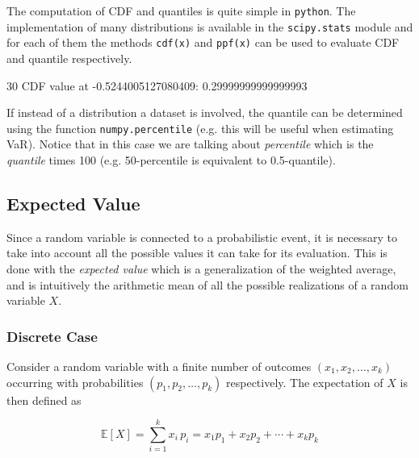 The computation of CDF and quantiles is quite simple in \texttt{python}. The implementation of many distributions is available in the \texttt{scipy.stats} module and for each of them the methods \texttt{cdf(x)} and \texttt{ppf(x)} can be used to evaluate CDF and quantile respectively.


\begin{ioutput}
30%
CDF value at -0.5244005127080409: 0.29999999999999993
\end{ioutput}

If instead of a distribution a dataset is involved, the quantile can be determined using the function \texttt{numpy.percentile} (e.g. this will be useful when estimating VaR). Notice that in this case we are talking about \emph{percentile} which is the \emph{quantile} times 100 (e.g. 50-percentile is equivalent to 0.5-quantile).


\begin{ioutput}
[1.08 5.  ]
\end{ioutput}

\subsection{Expected Value}\label{sec:expected-value}

Since a random variable is connected to a probabilistic event, it is necessary to take into account all the possible values it can take for its evaluation. This is done with the \emph{expected value} which is a generalization of the weighted average, and is intuitively the arithmetic mean of all the possible realizations of a random variable $X$.

\subsubsection{Discrete Case}
Consider a random variable with a finite number of outcomes $(x_{1},x_{2},\ldots ,x_{k})$ occurring with probabilities $(p_{1},p_{2},\ldots ,p_{k})$ respectively. The expectation of $X$ is then defined as

\begin{equation}
\mathbb{E}[X]=\sum _{i=1}^{k}x_{i}\,p_{i}=x_{1}p_{1}+x_{2}p_{2}+\cdots +x_{k}p_{k}
\end{equation}

